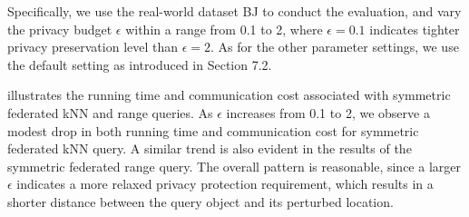 Specifically, we use the real-world dataset BJ to conduct the evaluation, and vary the privacy budget $\epsilon$ within a range from 0.1 to 2, where $\epsilon=0.1$ indicates tighter privacy preservation level than $\epsilon=2$.
As for the other parameter settings, we use the default setting as introduced in Section 7.2.

 illustrates the running time and communication cost associated with symmetric federated kNN and range queries. As $\epsilon$ increases from 0.1 to 2, we observe a modest drop in both running time and communication cost for symmetric federated kNN query. 
A similar trend  is also evident in the results of the symmetric federated range query. The overall pattern is reasonable, since a larger $\epsilon$ indicates a more relaxed privacy protection requirement, which results in a shorter distance between the query object and its perturbed location.